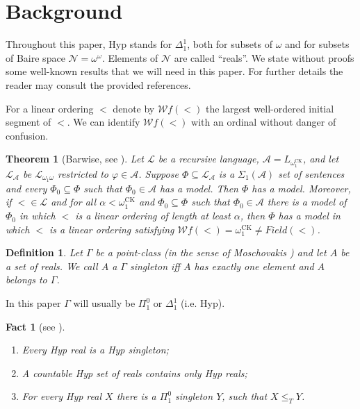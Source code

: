 \documentclass[11pt, english]{article}
\newtheorem{thm}{Theorem}
\newtheorem{defn}{Definition}
\newtheorem{fact}{Fact}
\newcommand{\A}{\mbox{$\mathcal{A}$}}
\newcommand{\LL}{\mbox{$\mathcal{L}$}}
\DeclareMathOperator{\ck}{CK}
\newcommand{\baire}{\mathscr N}
\begin{document}
\section{Background}

Throughout this paper, Hyp stands for $\Delta^1_1$, both for subsets
of $\omega$ and for subsets of Baire space $\baire=\omega^{\omega}$.
Elements of $\baire$ are called ``reals''. We state without proofs
some well-known results that we will need in this paper. For further
details the reader may consult the provided references.

For a linear ordering $<$ denote by $\mathcal{W}f(<)$ the largest
well-ordered initial segment of $<$. We can identify
$\mathcal{W}f(<)$ with an ordinal without danger of confusion.

\begin{thm}[Barwise, see \cite{Barwise}]\label{Barwise}
Let $\LL$ be a recursive language, $\A=L_{\omega_1^{\ck}}$, and let
$\LL_{\mathcal{A}}$ be $\LL_{\omega_1\omega}$ restricted to
$\varphi\in \A$. Suppose $\Phi\subseteq\LL_{\mathcal{A}}$ is a
$\Sigma_1(\A)$ set of sentences and every $\Phi_0\subseteq\Phi$ such
that $\Phi_0\in \A$ has a model. Then $\Phi$ has a model. Moreover,
if $<\in\LL$ and for all $\alpha<\omega_1^{\ck}$ and
$\Phi_0\subseteq\Phi$ such that $\Phi_0\in \A$ there is a model of
$\Phi_0$ in which $<$ is a linear ordering of length at least
$\alpha$, then $\Phi$ has a model in which $<$ is a linear ordering
satisfying $\mathcal{W}f(<)=\omega_1^{\ck}\neq Field(<)$.
\end{thm}

\begin{defn}
Let $\Gamma$ be a point-class (in the sense of Moschovakis
\cite{moschovakis80}) and let $A$ be a set of reals. We call $A$
\emph{a $\Gamma$ singleton} iff $A$ has exactly one element and $A$
belongs to $\Gamma$.
\end{defn}

In this paper $\Gamma$ will usually be $\Pi^0_1$ or $\Delta^1_1$ (i.e. Hyp).

\begin{fact}[see \cite{Rogers,Sacks}]\label{fct0}
 \begin{enumerate}
  \item Every Hyp real is a Hyp singleton;
  \item A countable Hyp set of reals contains only Hyp reals;
  \item For every Hyp real $X$ there is a $\Pi^0_1$ singleton $Y$, such that $X\leq_T Y$.
 \end{enumerate}
\end{fact}
\end{document}
